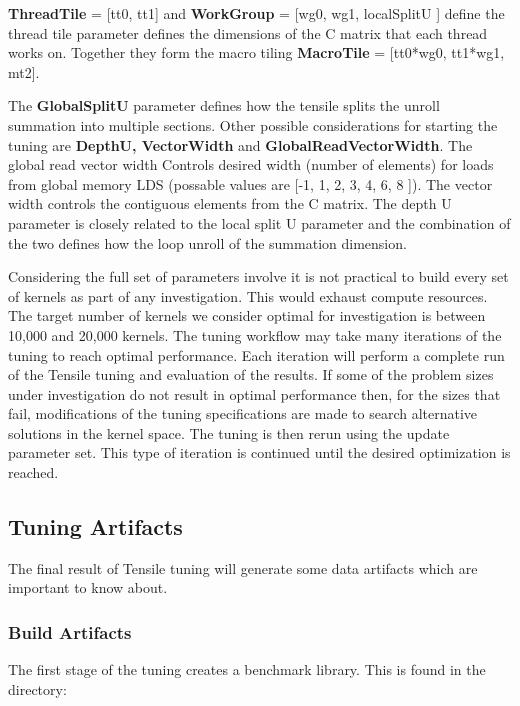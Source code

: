 \documentclass[]{article}
\begin{document}
{\color{ForestGreen} \bf ThreadTile} = [tt0, tt1] and {\color{ForestGreen} \bf  WorkGroup} = [wg0, wg1, localSplitU ] define the thread tile parameter defines the dimensions of the C matrix that each thread works on. Together they form the macro tiling {\color{ForestGreen} \bf MacroTile} = [tt0*wg0, tt1*wg1, mt2].
 
The {\color{ForestGreen} \bf GlobalSplitU} parameter defines how the tensile splits the unroll summation into multiple sections. Other possible considerations for starting the tuning are {\color{ForestGreen} \bf DepthU, VectorWidth} and {\color{ForestGreen} \bf GlobalReadVectorWidth}. The global read vector width Controls desired width (number of elements) for loads from global memory LDS (possable values are [-1, 1, 2, 3, 4, 6, 8 ]). The vector width controls the contiguous elements from the C matrix. The depth U parameter is closely related to the local split U parameter and the combination of the two defines how the loop unroll of the summation dimension.

Considering the full set of parameters involve it is not practical to build every set of kernels as part of any investigation. This would exhaust compute resources. The target number of kernels we consider optimal for investigation is between 10,000 and 20,000 kernels. The tuning workflow may take many iterations of the tuning to reach optimal performance. Each iteration will perform a complete run of the Tensile tuning and evaluation of the results. If some of the problem sizes under investigation do not result in optimal performance then, for the sizes that fail, modifications of the tuning specifications are made to search alternative solutions in the kernel space. The tuning is then rerun using the update parameter set. This type of iteration is continued until the desired optimization is reached.

\subsection{Tuning Artifacts}
The final result of Tensile tuning will generate some data artifacts which are important to know about. 

\subsubsection{Build Artifacts}
The first stage of the tuning creates a benchmark library. This is found in the directory:
 
\end{document}
